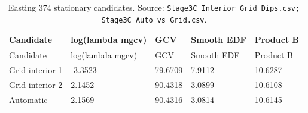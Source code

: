 \begin{longtable}{@{}p{3.3cm}p{3.2cm}p{2cm}p{2.7cm}p{2.2cm}@{}}
\caption{Easting 374 stationary candidates. Source: \texttt{Stage3C\_Interior\_Grid\_Dips.csv; Stage3C\_Auto\_vs\_Grid.csv}.}\label{tab:easting-374-stationary-candidates}\\
\toprule
Candidate & log(lambda mgcv) & GCV & Smooth EDF & Product B\\
\midrule
\endfirsthead
\toprule
Candidate & log(lambda mgcv) & GCV & Smooth EDF & Product B\\
\midrule
\endhead
Grid interior 1 & -3.3523 & 79.6709 & 7.9112 & 10.6287\\
Grid interior 2 & 2.1452 & 90.4318 & 3.0899 & 10.6108\\
Automatic & 2.1569 & 90.4316 & 3.0814 & 10.6145\\
\bottomrule
\end{longtable}
